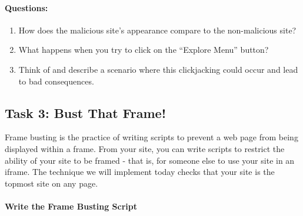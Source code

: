 \paragraph{Questions:}
\begin{enumerate}
    \item How does the malicious site’s appearance compare to the non-malicious site?
    \item What happens when you try to click on the ``Explore Menu” button?
    \item Think of and describe a scenario where this clickjacking could occur and lead to bad consequences.
\end{enumerate}



\subsection{Task 3: Bust That Frame!}
Frame busting is the practice of writing scripts to prevent a web page from being displayed within a frame. From your site, you can write scripts to restrict the ability of your site to be framed - that is, for someone else to use your site in an iframe. The technique we will implement today checks that your site is the topmost site on any page. 


\paragraph{Write the Frame Busting Script} 

